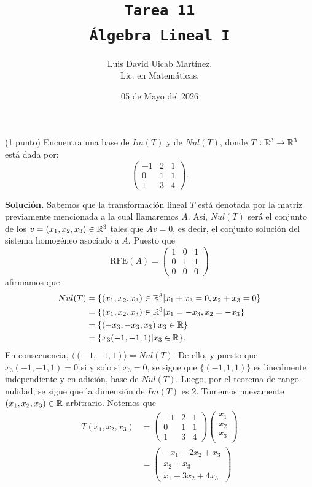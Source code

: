 \documentclass[11pt]{scrartcl}
\title{\texttt{Tarea 11
\\ Álgebra Lineal I}}
\author{Luis David Uicab Martínez. 
\\Lic. en Matemáticas.}
\date{05 de Mayo del 2026}
\begin{document}
\maketitle
\begin{mdframed}[style=mdpurplebox, frametitle={Ejercicio 1, Tarea 11, Álgebra Lineal I}]
    (1 punto) Encuentra una base de $Im(T)$ y de $Nul(T)$, donde $T:\mathbb R^3\rightarrow \mathbb R^3$ está dada por:
    \begin{equation*}
        \begin{pmatrix}
            -1 & 2 & 1 \\
            0 & 1 & 1 \\
            1 & 3 & 4
        \end{pmatrix}.
    \end{equation*}
\end{mdframed}
\textbf{Solución.} Sabemos que la transformación lineal $T$ está denotada por la matriz previamente mencionada a la
cual llamaremos $A$. Así, $Nul(T)$ será el conjunto de los $v=(x_1,x_2,x_3) \in \mathbb R^3$ tales que $Av=0$, es decir, el conjunto solución
del sistema homogéneo asociado a $A$. Puesto que
\begin{equation*}
    \text{RFE}(A)=
    \begin{pmatrix}
        1 & 0 & 1 \\
        0 & 1 & 1 \\
        0 & 0 & 0
    \end{pmatrix}
\end{equation*}
afirmamos que
\begin{align*}
    Nul(T) &= \{(x_1,x_2,x_3)\in \mathbb R^3|x_1+x_3=0, x_2+x_3=0\} \\
    &= \{(x_1,x_2,x_3)\in \mathbb R^3|x_1=-x_3, x_2=-x_3\} \\
    &= \{(-x_3,-x_3,x_3)|x_3 \in \mathbb R\} \\
    &= \{x_3(-1,-1,1)|x_3 \in \mathbb R\}.
\end{align*}
En consecuencia, $\langle(-1,-1,1)\rangle = Nul(T)$. De ello, y puesto que $x_3(-1,-1,1)=0$ si y solo si $x_3=0$, se sigue que $\{(-1,1,1)\}$ es linealmente
independiente y en adición, base de $Nul(T)$. Luego, por el teorema de rango-nulidad, se sigue que la dimensión de $Im(T)$ es 2. Tomemos nuevamente $(x_1,x_2,x_3) \in \mathbb R$
arbitrario. Notemos que
\begin{align*}
    T(x_1,x_2,x_3) &=
    \begin{pmatrix}
        -1 & 2 & 1 \\
        0 & 1 & 1 \\
        1 & 3 & 4        
    \end{pmatrix}
    \begin{pmatrix}
        x_1 \\
        x_2 \\
        x_3 \\        
    \end{pmatrix} \\
    &=
    \begin{pmatrix}
        -x_1 + 2x_2 + x_3 \\
        x_2 + x_3 \\
        x_1 + 3x_2 + 4x_3
    \end{pmatrix}
\end{align*}
\end{document}
